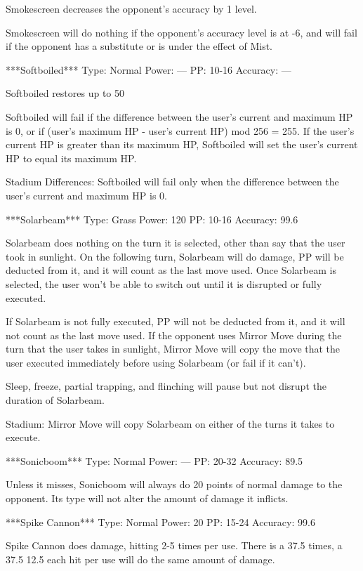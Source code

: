 \documentclass[reprint, aps, prl, paper=A4]{revtex4-1}
\begin{document}
Smokescreen decreases the opponent's accuracy by 1 level.

Smokescreen will do nothing if the opponent's accuracy level is at -6, and will fail if the
opponent has a substitute or is under the effect of Mist.


***Softboiled***
Type: Normal
Power: ---
PP: 10-16
Accuracy: ---

Softboiled restores up to 50%

Softboiled will fail if the difference between the user's current and maximum HP is 0, or if
(user's maximum HP - user's current HP) mod 256 = 255. If the user's current HP is greater than
its maximum HP, Softboiled will set the user's current HP to equal its maximum HP.

Stadium Differences:
Softboiled will fail only when the difference between the user's current and maximum HP is 0.


***Solarbeam***
Type: Grass
Power: 120
PP: 10-16
Accuracy: 99.6%

Solarbeam does nothing on the turn it is selected, other than say that the user took in
sunlight. On the following turn, Solarbeam will do damage, PP will be deducted from it, and it
will count as the last move used. Once Solarbeam is selected, the user won't be able to switch
out until it is disrupted or fully executed.

If Solarbeam is not fully executed, PP will not be deducted from it, and it will not count as
the last move used. If the opponent uses Mirror Move during the turn that the user takes in
sunlight, Mirror Move will copy the move that the user executed immediately before using
Solarbeam (or fail if it can't).

Sleep, freeze, partial trapping, and flinching will pause but not disrupt the duration of
Solarbeam.

Stadium:
Mirror Move will copy Solarbeam on either of the turns it takes to execute.


***Sonicboom***
Type: Normal
Power: ---
PP: 20-32
Accuracy: 89.5%

Unless it misses, Sonicboom will always do 20 points of normal damage to the opponent. Its type
will not alter the amount of damage it inflicts.


***Spike Cannon***
Type: Normal
Power: 20
PP: 15-24
Accuracy: 99.6%

Spike Cannon does damage, hitting 2-5 times per use. There is a 37.5%
times, a 37.5%
12.5%
each hit per use will do the same amount of damage.
\end{document}
